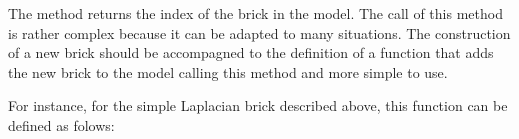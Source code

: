 \documentclass[a4paper,11pt,english]{sphinxmanual}
\begin{document}
\begin{sphinxVerbatim}[commandchars=\\\{\}]
   
                    
                    
                    
                   
\end{sphinxVerbatim}

The method returns the index of the brick in the model. The call of this method is
rather complex because it can be adapted to many situations. The construction of a
new brick should be accompagned to the definition of a function that adds the new
brick to the model calling this method and more simple to use.

For instance, for the simple Laplacian brick described above, this function can be
defined as folows:
\end{document}
